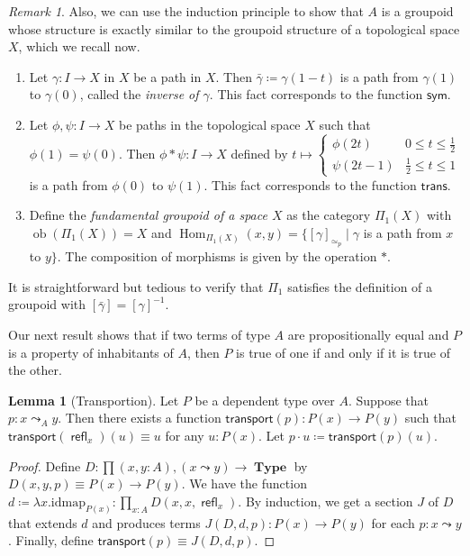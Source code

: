 \documentclass[10pt,letterpaper,cm]{nupset}
\theoremstyle{definition}
\theoremstyle{theorem}
\newtheorem{lemma}[definition]{Lemma}
\theoremstyle{remark}
\newtheorem{remark}[definition]{Remark}
\newcommand{\1}{\mathbf{1}}
\newcommand{\0}{\vec 0}
\DeclareMathOperator{\ob}{ob}
\DeclareMathOperator{\refl}{\mathsf{refl}}
\DeclareMathOperator{\Hom}{Hom}
\DeclareMathOperator{\type}{\mathbf{Type}}
\begin{document}
\begin{remark} Also, we can use the induction principle to show that $A$ is a groupoid whose structure is exactly similar to the groupoid structure of a topological space $X$, which we recall now.
\begin{enumerate}
\item Let $\gamma : I \to X$ in $X$ be a path in $X$. Then $\bar{\gamma}\coloneqq \gamma(1-t)$ is a path from $\gamma(1)$ to $\gamma(0)$, called the \textit{inverse of $\gamma$}. This fact corresponds to the function $\mathsf{sym}$. 
\item Let $\phi, \psi: I \to X$ be paths in the topological space $X$ such that $\phi(1) = \psi(0)$. Then $\phi \ast \psi : I \to X$ defined by  $t\mapsto  \begin{cases} \phi(2t) & 0\leq t \leq \frac{1}{2} \\ \psi(2t-1) & \frac{1}{2} \leq t \leq 1 \end{cases}$ is a path from $\phi(0)$ to $\psi(1)$. This fact corresponds to the function $\mathsf{trans}$.
\item Define the \textit{fundamental groupoid of a space $X$} as the category $\Pi_1(X)$ with $\ob(\Pi_1(X)) = X$ and $\Hom_{\Pi_1(X)}(x,y) = \{[\gamma]_{\simeq_p} \mid \gamma$ is a path from $x$ to $y\}$. The composition of morphisms is given by the operation $\ast$. 
\end{enumerate}
It is straightforward but tedious to verify that $\Pi_1$ satisfies the definition of a groupoid with $[\bar{\gamma}] = [\gamma]^{{-}1}$.
\end{remark}

Our next result shows that if two terms of type $A$ are propositionally equal and $P$ is a property of inhabitants of $A$, then $P$ is true of one if and only if it is true of the other.

\begin{lemma}[Transportion]
Let $P$ be a dependent type over $A$. Suppose that $p: x\leadsto_A y$. Then there exists a function $\mathsf{transport}(p) : P(x) \to P(y)$ such that $\mathsf{transport}(\refl_x)(u) \equiv u$ for any $u: P(x)$. Let $p \cdot u \coloneqq \mathsf{transport}(p)(u)$.
\end{lemma}
\begin{proof}
Define $D: \prod (x,y:A), (x\leadsto y) \to \type$ by  $D(x,y,p) \equiv P(x) \to P(y)$. We have the function $d\coloneqq \lambda x.\text{idmap}_{P(x)} :\prod_{x:A}D(x,x,\refl_x)$. By induction, we get a section $J$ of $D$ that extends $d$ and produces terms $J(D,d,p) :P(x) \to P(y)$ for each $p: x\leadsto y$. Finally, define $\mathsf{transport}(p) \equiv J(D,d,p)$.
\end{proof}
\end{document}
